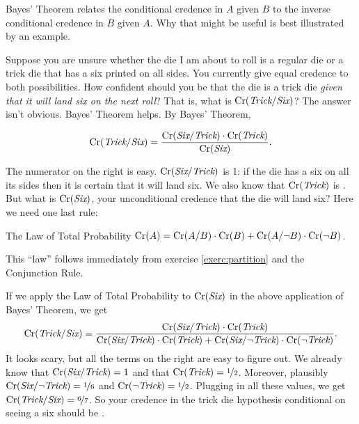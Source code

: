 Bayes' Theorem relates the conditional credence in $A$ given $B$ to the
inverse conditional credence in $B$ given $A$. Why that might be
useful is best illustrated by an example.

Suppose you are unsure whether the die I am about to roll is a regular
die or a trick die that has a six printed on all sides. You currently
give equal credence to both possibilities. How confident should you be
that the die is a trick die \emph{given that it will land six on the
  next roll}? That is, what is $\text{Cr}(\emph{Trick}/ \emph{Six})$? The
answer isn't obvious. Bayes' Theorem helps. By Bayes' Theorem,

\[
  \text{Cr}(\emph{Trick}/\emph{Six}) = \frac{\text{Cr}(\emph{Six}/\emph{Trick}) \cdot \text{Cr}(\emph{Trick})}{\text{Cr}(\emph{Six})}.
\]

\medskip\noindent%
The numerator on the right is easy. $\text{Cr}(\emph{Six}/ \emph{Trick})$ is
1: if the die has a six on all its sides then it is certain that it
will land six. We also know that $\text{Cr}(\emph{Trick})$ is
. But what is $\text{Cr}(\emph{Six})$, your unconditional
credence that the die will land six? Here we need one last rule:

\begin{genericthm}{The Law of Total Probability}
  $\text{Cr}(A) = \text{Cr}(A/B)\cdot \text{Cr}(B) + \text{Cr}(A/\neg B)\cdot \text{Cr}(\neg B)$.
\end{genericthm}
This ``law'' follows immediately from exercise \ref{exerc:partition}
and the Conjunction Rule.

If we apply the Law of Total Probability to $\text{Cr}(\emph{Six})$ in the above
application of Bayes' Theorem, we get
\[
  \text{Cr}(\emph{Trick}/\emph{Six}) = \frac{\text{Cr}(\emph{Six}/\emph{Trick}) \cdot \text{Cr}(\emph{Trick})}{
\text{Cr}(\emph{Six}/\emph{Trick}) \cdot \text{Cr}(\emph{Trick}) + \text{Cr}(\emph{Six}/\neg \emph{Trick}) \cdot \text{Cr}(\neg\emph{Trick})
}.
\]
It looks scary, but all the terms on the right are easy to figure
out. We already know that $\text{Cr}(\emph{Six}/ \emph{Trick}) = 1$ and that
$\text{Cr}(\emph{Trick}) = \nicefrac{1}{2}$. Moreover, plausibly
$\text{Cr}(\emph{Six}/ \neg\emph{Trick}) = \nicefrac{1}{6}$ and $\text{Cr}(\neg
\emph{Trick}) = \nicefrac{1}{2}$. Plugging in all these values, we
get $\text{Cr}(\emph{Trick}/\emph{Six}) = \nicefrac{6}{7}$. So your credence
in the trick die hypothesis conditional on seeing a six should be
.


